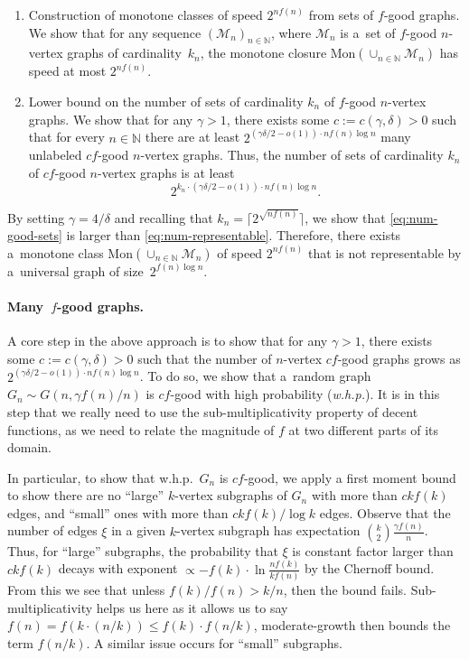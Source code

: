 \documentclass[letterpaper,11pt]{article}
\newcommand{\Slin}{moderate-growth\xspace}
\newcommand{\Smul}{sub-multiplicativity\xspace}
\newcommand{\Nn}{\mathbb{N}}
\newcommand{\Mc}{\mathcal{M}}
\theoremstyle{definition}
\theoremstyle{remark}
\newcommand{\mon}{\mathrm{Mon}}
\renewcommand{\leq}{\leqslant}
\begin{document}
\begin{enumerate}
		\item Construction of monotone classes of speed $2^{nf(n)}$ from sets of $f$-good graphs.
		We show that for any sequence $(\Mc_{n})_{n \in \Nn}$, where $\Mc_{n}$ is a~set of $f$-good $n$-vertex graphs of cardinality~$k_{n}$, the monotone closure $\mon(\cup_{n \in \Nn} \Mc_{n})$ has speed at most $2^{nf(n)}$.
		
		\item Lower bound on the number of sets of cardinality $k_n$ of $f$-good $n$-vertex graphs.
		We show that for any $\gamma>1$, there exists some $c:=c(\gamma,\delta)>0$ such that for every $n \in \Nn$ there are at least  $2^{(\gamma \delta/2-o(1))\cdot nf(n)\log n}$ many unlabeled $cf$-good $n$-vertex graphs. Thus, the number of sets of cardinality $k_n$ of $cf$-good $n$-vertex graphs is at least 
		\begin{equation}\label{eq:num-good-sets}
			2^{k_n \cdot (\gamma \delta/2-o(1))\cdot n f(n) \log n}.
		\end{equation}
		\label{itme:many-sets}
	\end{enumerate}
	
	By setting $\gamma = 4/\delta$ and recalling that $k_n = \lceil 2^{\sqrt{nf(n)}} \rceil$, 
	we show that \cref{eq:num-good-sets} is larger than \cref{eq:num-representable}. 
	Therefore, there exists a~monotone class $\mon(\cup_{n \in \Nn} \Mc_{n})$ of speed $2^{nf(n)}$ that is not representable by a~universal graph of size~$2^{f(n)\log n}$.
	
	\paragraph{Many~$f$-good graphs.}
	A core step in the above approach is to show that for any $\gamma>1$, there exists some $c:=c(\gamma,\delta)>0$ such that the number of $n$-vertex $cf$-good graphs grows as $2^{(\gamma \delta/2-o(1))\cdot nf(n)\log n}$. To do so, we show that a~random graph $G_n \sim G(n, \gamma f(n)/n)$ is $cf$-good with high probability (\emph{w.h.p.}). It is in this step that we really need to use the \Smul property of decent functions, as we need to relate the magnitude of $f$ at two different parts of its domain. 
	
In particular, to show that w.h.p.\ $G_n$ is $cf$-good, we apply a first moment bound to show there are no ``large'' $k$-vertex subgraphs of $G_n$ with more than $ckf(k)$ edges, and ``small'' ones with more than $ckf(k)/\log k$ edges. Observe that the number of edges $\xi$ in a given $k$-vertex subgraph has expectation $\binom{k}{2}\frac{\gamma f(n)}{n}$. Thus, for ``large'' subgraphs, the probability that $\xi$ is constant factor larger than $ckf(k)$ decays with exponent  $\propto - f(k)\cdot\ln \frac{nf(k)}{kf(n)} $ by the Chernoff bound. From this we see that unless $ f(k)/ f(n)  > k/ n$, then the bound fails. Sub-multiplicativity helps us here as it allows us to say $f(n) = f(k\cdot (n/k))\leq f(k)\cdot f(n/k) $, \Slin then bounds the term $f(n/k)$. A similar issue occurs for ``small'' subgraphs.
	
\end{document}
